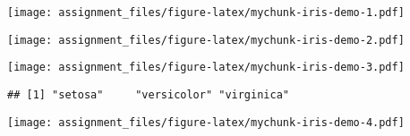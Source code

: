 \documentclass{article}
\begin{document}
\texttt{[image: assignment\_files/figure-latex/mychunk-iris-demo-1.pdf]}

\begin{Shaded}
\begin{Highlighting}[]
\NormalTok{(iris[,}\OperatorTok{-}\NormalTok{]);}
\end{Highlighting}
\end{Shaded}

\texttt{[image: assignment\_files/figure-latex/mychunk-iris-demo-2.pdf]}

\begin{Shaded}
\begin{Highlighting}[]
\NormalTok{(iris[,}\OperatorTok{-}\NormalTok{],}\NormalTok{iris[,}\NormalTok{]);}
\end{Highlighting}
\end{Shaded}

\texttt{[image: assignment\_files/figure-latex/mychunk-iris-demo-3.pdf]}

\begin{Shaded}
\begin{Highlighting}[]
\NormalTok{(iris[,}\NormalTok{]);}
\end{Highlighting}
\end{Shaded}

\begin{verbatim}
## [1] "setosa"     "versicolor" "virginica"
\end{verbatim}

\begin{Shaded}
\begin{Highlighting}[]
\StringTok{ }\NormalTok{(}\NormalTok{,}\NormalTok{,}\NormalTok{);}
\NormalTok{(iris[,}\OperatorTok{-}\NormalTok{],}
\end{Highlighting}
\end{Shaded}

\texttt{[image: assignment\_files/figure-latex/mychunk-iris-demo-4.pdf]}

\begin{Shaded}
\begin{Highlighting}[]
\StringTok{ }\NormalTok{(iris[,}\NormalTok{]);}

\NormalTok{(iris[,}\NormalTok{]);  }
\end{Highlighting}
\end{Shaded}
\end{document}
